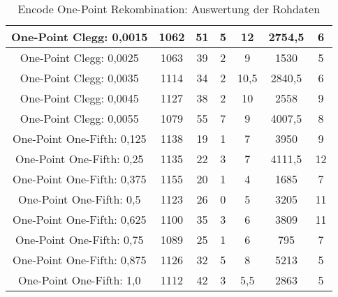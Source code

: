 \begin{table}[H]
\begin{tabular}{c | c | c | c | c | c | c}
		\hline
		One-Point Clegg: 0,0015 & 1062 & 51 & 5 & 12 & 2754,5 & 6\\
		\hline
		One-Point Clegg: 0,0025 & 1063 & 39 & 2 & 9 & 1530 & 5\\
		\hline
		One-Point Clegg: 0,0035 & 1114 & 34 & 2 & 10,5 & 2840,5 & 6\\
		\hline
		One-Point Clegg: 0,0045 & 1127 & 38 & 2 & 10 & 2558 & 9\\
		\hline
		One-Point Clegg: 0,0055 & 1079 & 55 & 7 & 9 & 4007,5 & 8\\
		\hline
		One-Point One-Fifth: 0,125 & 1138 & 19 & 1 & 7 & 3950 & 9\\
		\hline
		One-Point One-Fifth: 0,25 & 1135 & 22 & 3 & 7 & 4111,5 & 12\\
		\hline
		One-Point One-Fifth: 0,375 & 1155 & 20 & 1 & 4 & 1685 & 7\\
		\hline
		One-Point One-Fifth: 0,5 & 1123 & 26 & 0 & 5 & 3205 & 11\\
		\hline
		One-Point One-Fifth: 0,625 & 1100 & 35 & 3 & 6 & 3809 & 11\\
		\hline
		One-Point One-Fifth: 0,75 & 1089 & 25 & 1 & 6 & 795 & 7\\
		\hline
		One-Point One-Fifth: 0,875 & 1126 & 32 & 5 & 8 & 5213 & 5\\
		\hline
		One-Point One-Fifth: 1,0 & 1112 & 42 & 3 & 5,5 & 2863 & 5\\
	\end{tabular}
	\caption{Encode One-Point Rekombination: Auswertung der Rohdaten}
	\label{table:encodeOnePointRohdaten}
\end{table}

